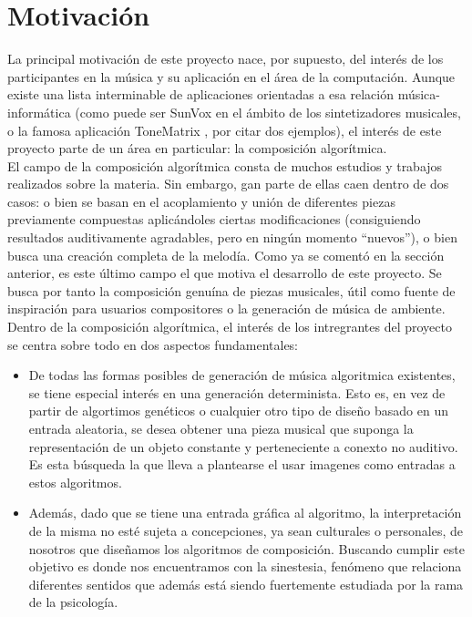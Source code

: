 \section{Motivación}
\label{sec:motivacion}


La principal motivación de este proyecto nace, por supuesto, del interés de los participantes en la música y su aplicación en el área de la computación. Aunque existe una lista interminable de aplicaciones orientadas a esa relación música-informática (como puede ser SunVox \cite{SunVox} en el ámbito de los sintetizadores musicales, o la famosa aplicación ToneMatrix \cite{toneMatrix}, por citar dos ejemplos), el interés de este proyecto parte de un área en particular: la composición algorítmica.\\

El campo de la composición algorítmica consta de muchos estudios y trabajos realizados sobre la materia. Sin embargo, gan parte de ellas caen dentro de dos casos: o bien se basan en el acoplamiento y unión de diferentes piezas previamente compuestas aplicándoles ciertas modificaciones (consiguiendo resultados auditivamente agradables, pero en ningún momento ``nuevos''), o bien busca una creación completa de la melodía. Como ya se comentó en la sección anterior, es este último campo el que motiva el desarrollo de este proyecto. Se busca por tanto la composición genuína de piezas musicales, útil como fuente de inspiración para usuarios compositores o la generación de música de ambiente.\\

Dentro de la composición algorítmica, el interés de los intregrantes del proyecto se centra sobre todo en dos aspectos fundamentales:

\begin{itemize}

	\item De todas las formas posibles de generación de música algoritmica existentes, se tiene especial interés en una generación determinista. Esto es, en vez de partir de algortimos genéticos o cualquier otro tipo de diseño basado en un entrada aleatoria, se desea obtener una pieza musical que suponga la representación de un objeto constante y perteneciente a conexto no auditivo. Es esta búsqueda la que lleva a plantearse el usar imagenes como entradas a estos algoritmos.
	
	\item Además, dado que se tiene una entrada gráfica al algoritmo, la interpretación de la misma no esté sujeta a concepciones, ya sean culturales o personales, de nosotros que diseñamos los algoritmos de composición. Buscando cumplir este objetivo es donde nos encuentramos con la sinestesia, fenómeno que relaciona diferentes sentidos que además está siendo fuertemente estudiada por la rama de la psicología.
	
\end{itemize}

